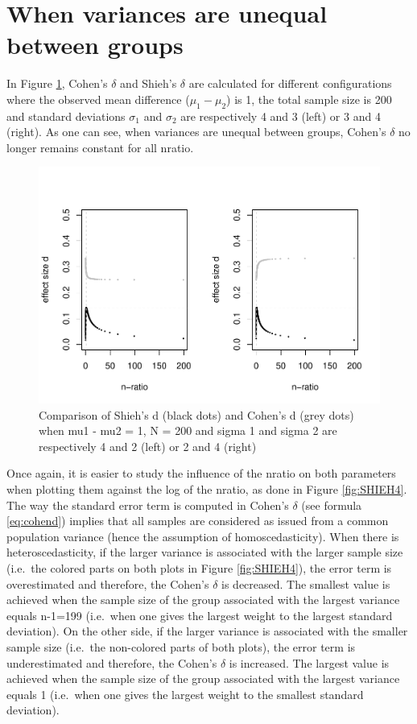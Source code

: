 \documentclass[
  man]{apa6}
\begin{document}
\hypertarget{when-variances-are-unequal-between-groups}{%
\section{When variances are unequal between groups}\label{when-variances-are-unequal-between-groups}}

In Figure \ref{fig:SHIEH3}, Cohen's \(\delta\) and Shieh's \(\delta\) are calculated for different configurations where the observed mean difference (\(\mu_{1}-\mu_{2}\)) is 1, the total sample size is 200 and standard deviations \(\sigma_{1}\) and \(\sigma_{2}\) are respectively 4 and 3 (left) or 3 and 4 (right). As one can see, when variances are unequal between groups, Cohen's \(\delta\) no longer remains constant for all nratio.

\begin{figure}
\centering
\includegraphics{Appendix1_files/figure-latex/SHIEH3-1.pdf}
\caption{\label{fig:SHIEH3}Comparison of Shieh's d (black dots) and Cohen's d (grey dots) when mu1 - mu2 = 1, N = 200 and sigma 1 and sigma 2 are respectively 4 and 2 (left) or 2 and 4 (right)}
\end{figure}

Once again, it is easier to study the influence of the nratio on both parameters when plotting them against the log of the nratio, as done in Figure \ref{fig:SHIEH4}.
The way the standard error term is computed in Cohen's \(\delta\) (see formula \ref{eq:cohend}) implies that all samples are considered as issued from a common population variance (hence the assumption of homoscedasticity). When there is heteroscedasticity, if the larger variance is associated with the larger sample size (i.e.~the colored parts on both plots in Figure \ref{fig:SHIEH4}), the error term is overestimated and therefore, the Cohen's \(\delta\) is decreased. The smallest value is achieved when the sample size of the group associated with the largest variance equals n-1=199 (i.e.~when one gives the largest weight to the largest standard deviation). On the other side, if the larger variance is associated with the smaller sample size (i.e.~the non-colored parts of both plots), the error term is underestimated and therefore, the Cohen's \(\delta\) is increased. The largest value is achieved when the sample size of the group associated with the largest variance equals 1 (i.e.~when one gives the largest weight to the smallest standard deviation).
\end{document}
